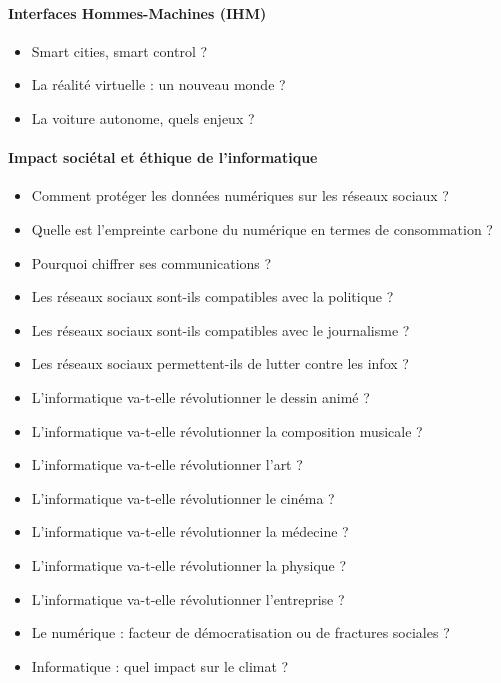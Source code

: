 \documentclass[
  a4paper,
  DIV=11,
  numbers=noendperiod]{scrartcl}
\let\oldparagraph\paragraph
\renewcommand{\paragraph}[1]{\oldparagraph{#1}\mbox{}}
\providecommand{\tightlist}{%
  \setlength{\itemsep}{0pt}\setlength{\parskip}{0pt}}\usepackage{longtable,booktabs,array}
\begin{document}
\hypertarget{interfaces-hommes-machines-ihm}{%
\paragraph{Interfaces Hommes-Machines
(IHM)}\label{interfaces-hommes-machines-ihm}}

\begin{itemize}
\tightlist
\item
  Smart cities, smart control ?
\item
  La réalité virtuelle : un nouveau monde ?
\item
  La voiture autonome, quels enjeux ?
\end{itemize}

\hypertarget{impact-sociuxe9tal-et-uxe9thique-de-linformatique}{%
\paragraph{Impact sociétal et éthique de
l'informatique}\label{impact-sociuxe9tal-et-uxe9thique-de-linformatique}}

\begin{itemize}
\tightlist
\item
  Comment protéger les données numériques sur les réseaux sociaux ?
\item
  Quelle est l'empreinte carbone du numérique en termes de consommation
  ?
\item
  Pourquoi chiffrer ses communications ?
\item
  Les réseaux sociaux sont-ils compatibles avec la politique ?
\item
  Les réseaux sociaux sont-ils compatibles avec le journalisme ?
\item
  Les réseaux sociaux permettent-ils de lutter contre les infox ?
\item
  L'informatique va-t-elle révolutionner le dessin animé ?
\item
  L'informatique va-t-elle révolutionner la composition musicale ?
\item
  L'informatique va-t-elle révolutionner l'art ?
\item
  L'informatique va-t-elle révolutionner le cinéma ?
\item
  L'informatique va-t-elle révolutionner la médecine ?
\item
  L'informatique va-t-elle révolutionner la physique ?
\item
  L'informatique va-t-elle révolutionner l'entreprise ?
\item
  Le numérique : facteur de démocratisation ou de fractures sociales ?
\item
  Informatique : quel impact sur le climat ?
\end{itemize}
\end{document}
